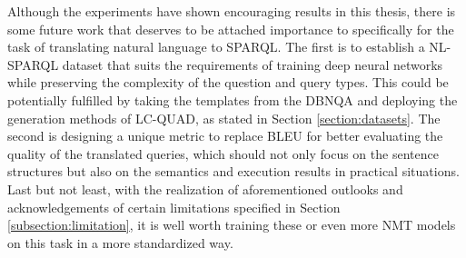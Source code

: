 Although the experiments have shown encouraging results in this thesis, there is some future work that deserves to be attached importance to specifically for the task of translating natural language to SPARQL. The first is to establish a NL-SPARQL dataset that suits the requirements of training deep neural networks while preserving the complexity of the question and query types. This could be potentially fulfilled by taking the templates from the DBNQA and deploying the generation methods of LC-QUAD, as stated in Section \ref{section:datasets}. The second is designing a unique metric to replace BLEU for better evaluating the quality of the translated queries, which should not only focus on the sentence structures but also on the semantics and execution results in practical situations. Last but not least, with the realization of aforementioned outlooks and acknowledgements of certain limitations specified in Section \ref{subsection:limitation}, it is well worth training these or even more NMT models on this task in a more standardized way. 




